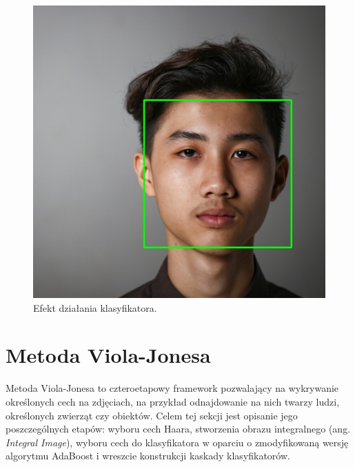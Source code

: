 \documentclass[12pt,a4paper,leqno,oneside,titlepage]{book}
\begin{document}
\begin{figure}[!tbp]
\begin{minipage}[b]{0.4\textwidth}
    \includegraphics[width=\textwidth]{pictures/face_detected.jpg}
    \caption{Efekt działania klasyfikatora.}
  \end{minipage}
\end{figure}

%
%
%
%
%
%
%
%
%
%
%

\section{Metoda Viola-Jonesa}

Metoda Viola-Jonesa to czteroetapowy framework pozwalający na wykrywanie określonych cech na zdjęciach, na przykład odnajdowanie na nich twarzy ludzi, określonych zwierząt czy obiektów. Celem tej sekcji jest opisanie jego poszczególnych etapów: wyboru cech Haara, stworzenia obrazu integralnego (ang. \textit{Integral Image}), wyboru cech do klasyfikatora w oparciu o zmodyfikowaną wersję algorytmu AdaBoost i wreszcie konstrukcji kaskady klasyfikatorów.\cite{ViolaJones01}
\end{document}
